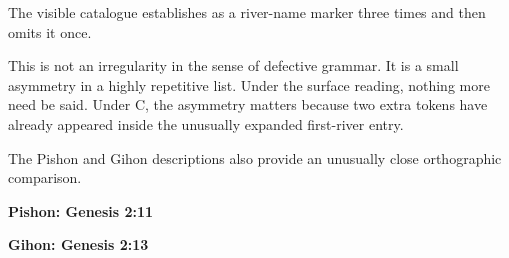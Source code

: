 The visible catalogue establishes  as a river-name marker three times and then omits it once.


This is not an irregularity in the sense of defective grammar.  It is a small asymmetry in a highly repetitive list.  Under the surface reading, nothing more need be said.  Under C, the asymmetry matters because two extra  tokens have already appeared inside the unusually expanded first-river entry.

The Pishon and Gihon descriptions also provide an unusually close orthographic comparison.

\noindent
\begin{minipage}[t]{0.48\linewidth}
{\centering\textbf{Pishon: Genesis 2:11}\par}
\end{minipage}
\hfill
\begin{minipage}[t]{0.48\linewidth}
{\centering\textbf{Gihon: Genesis 2:13}\par}
\end{minipage}

